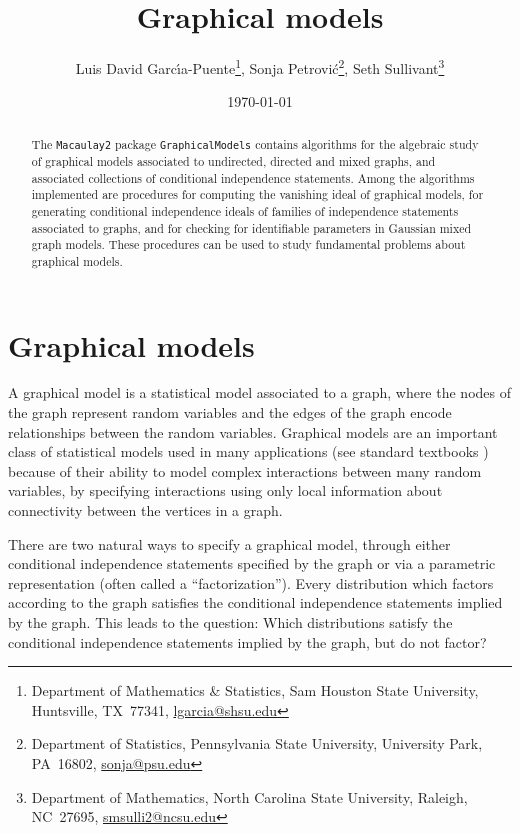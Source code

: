 \documentclass[letterpaper]{article}
\title{Graphical models}
\author{Luis David  Garc\'{\i}a-Puente\footnote{Department of Mathematics \& Statistics,         Sam Houston State University,          Huntsville, TX\ 77341, \href{mailto:lgarcia@shsu.edu}{lgarcia@shsu.edu}},
 Sonja Petrovi\'c\footnote{Department of Statistics,       Pennsylvania State University,           University Park, PA\ 16802, \href{mailto:petrovic@psu.edu}{sonja@psu.edu}}, 
 Seth Sullivant\footnote{Department of Mathematics,   North Carolina State University, Raleigh, NC\ 27695, \href{mailto:smsulli2@ncsu.edu}{smsulli2@ncsu.edu}}}
\date{\today}
\theoremstyle{plain}
\theoremstyle{definition}
\begin{document}
\maketitle


\begin{abstract}
The {\tt Macaulay2} package {\tt GraphicalModels} contains algorithms 
for the algebraic study of graphical models associated to undirected, 
directed and mixed graphs, 
and associated collections of 
conditional independence statements. 
Among the algorithms implemented are procedures for computing
the vanishing ideal of graphical models, for generating
conditional independence ideals of families of independence statements
associated to graphs, and for checking for identifiable parameters
in Gaussian mixed graph models.
These procedures can be used to study fundamental 
problems about graphical models. 
\end{abstract}


\section{Graphical models}\label{intro}

A graphical model is a statistical model associated to a graph,
where the nodes of the graph represent random variables and the
edges of the graph encode relationships between the random variables.
Graphical models are an important class of statistical models used
in many applications (see standard textbooks \cite{Lauritzen, Whitaker})
because of their ability to model complex interactions between
many random variables, by specifying
interactions using only local information about connectivity
between the vertices in a graph.

There are two natural ways to specify a graphical model, through 
either conditional independence statements specified by the graph
or via a parametric representation (often called a ``factorization'').
Every distribution which factors according to the graph
satisfies the conditional independence statements implied by the 
graph. This leads to the question:  Which distributions satisfy the conditional
independence statements implied by the graph, but do not factor?
\end{document}
